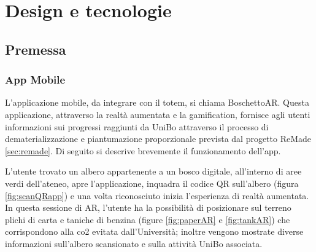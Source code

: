 \chapter{Design e tecnologie}
\section{Premessa}
\subsection{App Mobile}
L'applicazione mobile, da integrare con il totem, si chiama BoschettoAR. Questa applicazione, attraverso la realtà aumentata e la gamification, fornisce agli utenti informazioni sui progressi raggiunti da UniBo attraverso il processo di dematerializzazione e piantumazione proporzionale prevista dal progetto ReMade \ref{sec:remade}. Di seguito si descrive brevemente il funzionamento dell'app.

L'utente trovato un albero appartenente a un bosco digitale, all'interno di aree verdi dell'ateneo, apre l'applicazione, inquadra il codice QR sull'albero (figura \ref{fig:scanQRapp}) e una volta riconosciuto inizia l'esperienza di realtà aumentata. In questa sessione di AR, l'utente ha la possibilità di posizionare sul terreno plichi di carta e taniche di benzina (figure \ref{fig:paperAR} e \ref{fig:tankAR}) che corrispondono alla co2 evitata dall'Università; inoltre vengono mostrate diverse informazioni sull'albero scansionato e sulla attività UniBo associata.


